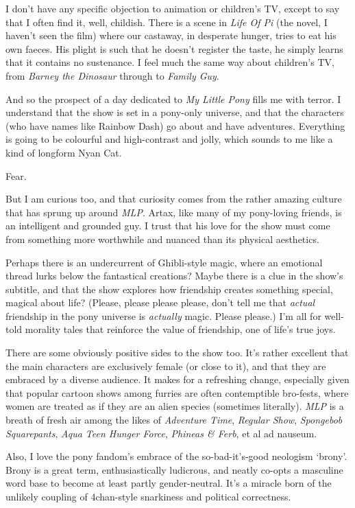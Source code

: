 I don’t have any specific objection to animation or children’s TV, except to say that I often find it, well, childish. There is a scene in \textit{Life Of Pi} (the novel, I haven’t seen the film) where our castaway, in desperate hunger, tries to eat his own faeces. His plight is such that he doesn’t register the taste, he simply learns that it contains no sustenance. I feel much the same way about children’s TV, from \textit{Barney the Dinosaur} through to \textit{Family Guy}.

And so the prospect of a day dedicated to \textit{My Little Pony} fills me with terror. I understand that the show is set in a pony-only universe, and that the characters (who have names like Rainbow Dash) go about and have adventures. Everything is going to be colourful and high-contrast and jolly, which sounds to me like a kind of longform Nyan Cat.

Fear.

But I am curious too, and that curiosity comes from the rather amazing culture that has sprung up around \textit{MLP}. Artax, like many of my pony-loving friends, is an intelligent and grounded guy. I trust that his love for the show must come from something more worthwhile and nuanced than its physical aesthetics.

Perhaps there is an undercurrent of Ghibli-style magic, where an emotional thread lurks below the fantastical creations? Maybe there is a clue in the show’s subtitle, and that the show explores how friendship creates something special, magical about life? (Please, please please please, don’t tell me that \textit{actual} friendship in the pony universe is \textit{actually} magic. Please please.) I’m all for well-told morality tales that reinforce the value of friendship, one of life’s true joys.

There are some obviously positive sides to the show too. It’s rather excellent that the main characters are exclusively female (or close to it), and that they are embraced by a diverse audience. It makes for a refreshing change, especially given that popular cartoon shows among furries are often contemptible bro-fests, where women are treated as if they are an alien species (sometimes literally). \textit{MLP} is a breath of fresh air among the likes of \textit{Adventure Time}, \textit{Regular Show}, \textit{Spongebob Squarepants}, \textit{Aqua Teen Hunger Force}, \textit{Phineas \& Ferb}, et al ad nauseum.

Also, I love the pony fandom’s embrace of the so-bad-it’s-good neologism ‘brony’. Brony is a great term, enthusiastically ludicrous, and neatly co-opts a masculine word base to become at least partly gender-neutral. It’s a miracle born of the unlikely coupling of 4chan-style snarkiness and political correctness.

